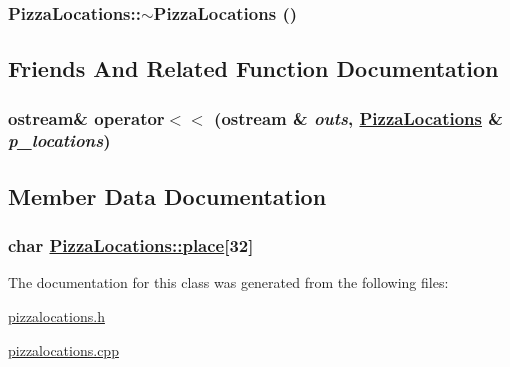 \hypertarget{class_pizza_locations_c0b369afc81c747d090da4b4d764fd58}{
\subsubsection[$\sim$PizzaLocations]{\setlength{\rightskip}{0pt plus 5cm}Pizza\-Locations::$\sim$Pizza\-Locations ()}}
\label{class_pizza_locations_c0b369afc81c747d090da4b4d764fd58}




\subsection{Friends And Related Function Documentation}
\hypertarget{class_pizza_locations_7a5ef62906b8b087fcc29903cd696ef0}{
\subsubsection[operator$<$$<$]{\setlength{\rightskip}{0pt plus 5cm}ostream\& operator$<$$<$ (ostream \& {\em outs}, \hyperlink{class_pizza_locations}{Pizza\-Locations} \& {\em p\_\-locations})}}
\label{class_pizza_locations_7a5ef62906b8b087fcc29903cd696ef0}




\subsection{Member Data Documentation}
\hypertarget{class_pizza_locations_247f35efd255fe4af3b63f76e9c58b25}{
\subsubsection[place]{\setlength{\rightskip}{0pt plus 5cm}char \hyperlink{class_pizza_locations_247f35efd255fe4af3b63f76e9c58b25}{Pizza\-Locations::place}\mbox{[}32\mbox{]}}}
\label{class_pizza_locations_247f35efd255fe4af3b63f76e9c58b25}




The documentation for this class was generated from the following files:\begin{CompactItemize}
\item 
\hyperlink{pizzalocations_8h}{pizzalocations.h}\item 
\hyperlink{pizzalocations_8cpp}{pizzalocations.cpp}\end{CompactItemize}
